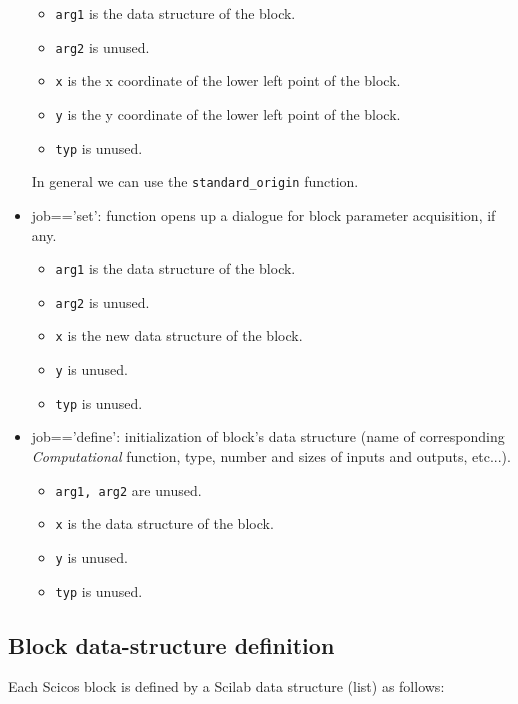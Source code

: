 \documentclass{book}
\newcommand{\computational}{{\em Computational }}
\begin{document}
\begin{itemize}
  \begin{itemize}
  \item  {\tt arg1} is the data structure of the block. 
  \item  {\tt arg2} is unused.
  \item {\tt x} is the x coordinate of the lower left point of the block.
  \item {\tt y} is the y coordinate of the lower left point of the block.
  \item {\tt typ} is unused.
  \end{itemize}
In general we can use the {\tt standard\_origin} function.
\item job=='set': function opens up a dialogue for block parameter
  acquisition, if any. 
  \begin{itemize}
  \item  {\tt arg1} is the data structure of the block. 
  \item  {\tt arg2} is unused.
  \item {\tt x} is the new data structure of the block.
  \item {\tt y} is unused.
  \item {\tt typ} is unused.
  \end{itemize}
\item  job=='define': initialization of block's data
  structure (name of corresponding \computational function, type, 
  number and sizes of inputs and outputs, etc...).
  \begin{itemize}
  \item  {\tt arg1, arg2} are unused.
  \item {\tt x} is the data structure of the block.
  \item {\tt y} is unused.
  \item {\tt typ} is unused.
  \end{itemize}
\end{itemize}

\subsection{Block data-structure definition}
\label{bds}
Each Scicos block is defined by a Scilab data structure (list) as
follows:
\end{document}
